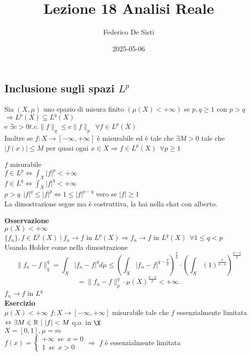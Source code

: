 \documentclass[12px]{article}
\title{Lezione 18 Analisi Reale}
\date{2025-05-06}
\author{Federico De Sisti}
\begin{document}
	\maketitle
	\newpage
	\subsection{Inclusione sugli spazi $L^p$}
	\begin{prop}
	Sia $(X,\mu)$ uno spazio di misura finito $(\mu(X) < +\infty)$ se  $p,q\geq 1$ con  $p>q$\\
	 $ \Rightarrow  L^p(X)\subsetneq L^q(X)$\\
	 e $\exists c> 0 t.c. \|f\|_q\leq c\|f\|_p \ \ \forall f\in L^p(X)$\\
	 Inoltre se  $f: X \rightarrow [-\infty, +\infty]$ è misurabile ed è tale che $\exists M> 0$ tale che  $|f(x)| \leq M$ per quasi ogni  $x\in X \Rightarrow f\in L^p(X) \ \ \forall p\geq 1 $ 
	\end{prop}
	 \begin{dimo}
		 $f$ misurabile\\
		 $f\in L^p \Leftrightarrow \int_X|f|^p < +\infty$\\
		 $f\in L^q \Leftrightarrow \int_X|f|^q < +\infty$\\
		 $p > q \ \ |f|^q \leq |f|^p \Leftrightarrow 1 \leq |f|^{p-q}$ vero se $|f|\geq 1$\\
		 La dimostrazione segue ma è costruttiva, la hai nella chat con alberto.\\
	 \end{dimo}
	 \textbf{Osservazione}\\
	 $\mu(X) <+\infty$\\
	 $\{f_n\}, f\in L^p(X)\ | \ f_n \rightarrow f $ in $L^p(X) \Rightarrow  f_n \rightarrow f$ in $L^q(X)\ \ \forall 1\leq q < p$\\
	 Usando Holder come nella dimostrazione
	  \[
		  \|f_n-f\|^q_q = \int_X|f_n-f|^qd \mu \leq \left(\int_X|f_n-f|^{q-\frac pq} \right)^{\frac qp}\cdot \left(\int_X (1)^{\frac q{p-q}} \right)^{\frac{p-q}p}
	 \] 
	 \[
	  = \|f_n-f\|^q_p\cdot \mu(X)^{\frac{p-q}p} < +\infty
	 .\] 
	 $f_n \rightarrow f$ in $L^q$ \\
	 \textbf{Esercizio}\\
	 $\mu(X) < +\infty$  $f: X \rightarrow [-\infty, +\infty]$ misurabile tale che $f$ essenzialmente limitata $ \Leftrightarrow \exists M\in \mathbb{R} \ | \ |f|<M$ q.o. in $\X$\\
	 $X = [0,1], \mu =m$\\
	 $f(x) = \begin{cases}
	 	+\infty \ \ se\ \  x = 0\\
		1 \ \ se\ \  x> 0
	 \end{cases} \Rightarrow $ $f$ è essenzialmente limitata\\
\end{document}
